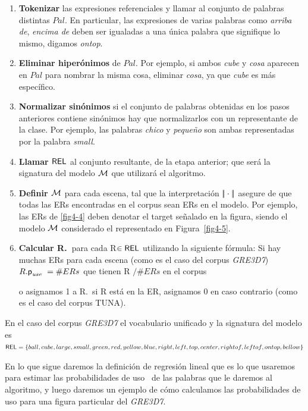 \begin{enumerate}
\item \textbf{Tokenizar} las expresiones referenciales y llamar al conjunto de palabras distintas
 $Pal$. En particular, las expresiones de varias palabras como {\it arriba de}, {\it encima de}
  deben ser igualadas a una \'unica palabra que signifique lo mismo, digamos \emph{ontop}.

\item \textbf{Eliminar hiper\'onimos} de $Pal$. Por ejemplo, si ambos \emph{cube} y
  \emph{cosa} aparecen en $Pal$ para nombrar la misma cosa, eliminar \emph{cosa}, ya que \emph{cube} es m\'as espec\'ifico.

\item \textbf{Normalizar sin\'onimos} si el conjunto de palabras obtenidas en los pasos anteriores contiene
  sin\'onimos hay que normalizarlos con un representante de la clase. Por ejemplo, las palabras \emph{chico}
  y \emph{peque\~no} son ambas representadas por la palabra \emph{small}.

\item \textbf{Llamar $\textsf{REL}$} al conjunto resultante, de la etapa anterior; que ser\'a la signatura del modelo $\mathcal{M}$ que utilizar\'a el algoritmo.

\item \textbf{Definir $\mathcal{M}$} para cada escena, tal que la interpretaci\'on
 $|\!|\cdot|\!|$ asegure de que todas las ERs encontradas en el corpus sean ERs en
  el modelo. Por ejemplo, las ERs de \ref{fig4-4} deben denotar el target se\~nalado en la figura, siendo el modelo 
$\mathcal{M}$ considerado el representado en Figura~\ref{fig4-5}.
\item \textbf{Calcular R.\puse\ }para cada R$\in \textsf{REL}$ utilizando la siguiente f\'ormula: Si
  hay muchas ERs para cada escena (como es el caso del corpus \textit{GRE3D7}) $R.\textsf{p}_\textit{use}\ = \#ERs$ que tienen R $/\#ERs$ en el corpus
    
  o asignamos 1 a R.\puse \ si R est\'a en la ER, asignamos 0 en caso contrario (como es el caso del corpus TUNA).
\end{enumerate}

En el caso del corpus \textit{GRE3D7} el vocabulario unificado y la signatura del modelo es 
$\textsf{REL} = \{ball, cube, large, small, green, red, yellow, blue, right, left, top, center, rightof, leftof, ontop,\\ 
bellow\} $

En lo que sigue daremos la definici\'on de regresi\'on lineal que es lo que usaremos para estimar las probabilidades de uso \puse\ de las palabras que le daremos al algoritmo, y luego daremos un ejemplo de c\'omo calculamos las probabilidades de uso para una figura particular del \textit{GRE3D7}.

